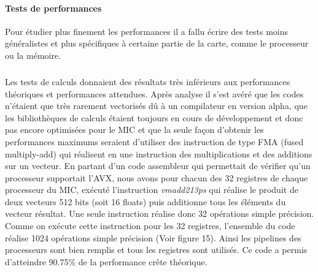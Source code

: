 \documentclass[11pt]{article}
\begin{document}
				\paragraph{Tests de performances}
				Pour étudier plus finement les performances il a fallu écrire des tests moins généralistes et plus spécifiques
				à certaine partie de la carte, comme le processeur ou la mémoire.
					\subparagraph{}
					Les tests de calculs donnaient des résultats très inférieurs aux performances théoriques et performances 
					attendues. Après analyse il s'est avéré que les codes n'étaient que très rarement vectorisés dû à un compilateur 
					en version alpha, que les bibliothèques de calculs étaient toujours en cours de développement et donc pas 
					encore optimisées pour le MIC et que la seule façon d'obtenir les performances maximums seraient d'utiliser
					des instruction de type FMA (fused multiply-add) qui réalisent en une instruction des multiplications et 
					des additions sur un vecteur. \newline
					En partant d'un code assembleur qui permettait de vérifier qu'un processeur supportait l'AVX, nous avons 
					pour chacun des 32 registres de chaque processeur du MIC, exécuté l'instruction \emph{vmadd213ps} qui réalise le 
					produit de deux vecteurs 512 bits (soit 16 floats) puis additionne tous les éléments du vecteur résultat.
					Une seule instruction réalise donc 32 opérations simple précision.
					Comme on exécute cette instruction pour les 32 registres, l'ensemble du code réalise 1024 opérations simple
					précision (Voir figure 15). Ainsi les pipelines des processeurs sont bien remplis et tous les registres sont
					utilisés. Ce code a permis d'atteindre 90.75\% de la performance crête théorique.
\end{document}
